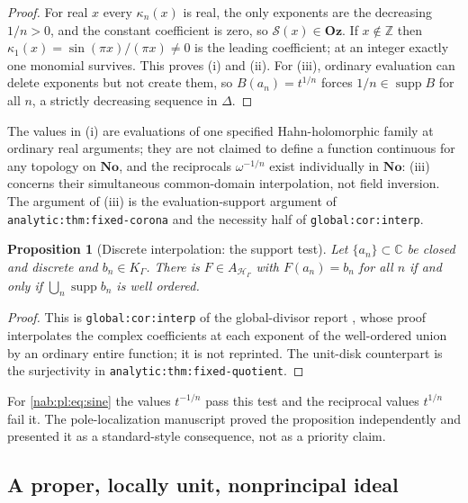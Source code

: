 \documentclass[11pt,letterpaper]{article}
\newtheorem{proposition}[proposition]{Proposition}
\theoremstyle{definition}
\theoremstyle{remark}
\newcommand{\C}{\mathbb C}
\newcommand{\Z}{\mathbb Z}
\newcommand{\No}{\mathbf{No}}
\newcommand{\HH}{\mathscr H_\Gamma}
\newcommand{\K}{K_\Gamma}
\newcommand{\supp}{\operatorname{supp}}
\newcommand{\Oz}{\mathbf{Oz}}
\numberwithin{equation}{section}
\begin{document}
\begin{proof}
For real $x$ every $\kappa_n(x)$ is real, the only exponents are the decreasing
$1/n>0$, and the constant coefficient is zero, so $\mathcal S(x)\in\Oz$. If
$x\notin\Z$ then $\kappa_1(x)=\sin(\pi x)/(\pi x)\neq0$ is the leading
coefficient; at an integer exactly one monomial survives. This proves (i) and
(ii). For (iii), ordinary evaluation can delete exponents but not create them,
so $B(a_n)=t^{1/n}$ forces $1/n\in\supp B$ for all $n$, a strictly decreasing
sequence in $\Delta$.
\end{proof}

The values in (i) are evaluations of one specified Hahn-holomorphic family at
ordinary real arguments; they are not claimed to define a function continuous
for any topology on $\No$, and the reciprocals $\omega^{-1/n}$ exist
individually in $\No$: (iii) concerns their simultaneous common-domain
interpolation, not field inversion. The argument of (iii) is the
evaluation-support argument of \nolinkurl{analytic:thm:fixed-corona} and the
necessity half of \nolinkurl{global:cor:interp}.

\begin{proposition}[Discrete interpolation: the support test]
\label{nab:pl:prop:interpolation}
Let $\{a_n\}\subset\C$ be closed and discrete and $b_n\in\K$. There is
$F\in A_{\HH}$ with $F(a_n)=b_n$ for all $n$ if and only if
$\bigcup_n\supp b_n$ is well ordered.
\end{proposition}

\begin{proof}
This is \nolinkurl{global:cor:interp} of the global-divisor report
\cite{RepoGlobal}, whose proof interpolates the complex coefficients at each
exponent of the well-ordered union by an ordinary entire function; it is not
reprinted. The unit-disk counterpart is the surjectivity in
\nolinkurl{analytic:thm:fixed-quotient}.
\end{proof}

For \eqref{nab:pl:eq:sine} the values $t^{-1/n}$ pass this test and the
reciprocal values $t^{1/n}$ fail it. The pole-localization manuscript proved
the proposition independently and presented it as a standard-style
consequence, not as a priority claim.

\subsection{A proper, locally unit, nonprincipal ideal}
\end{document}
